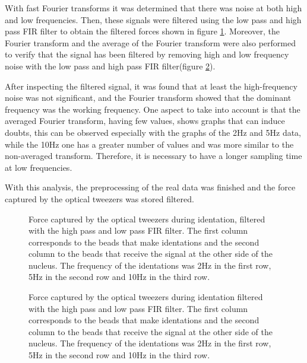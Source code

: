 \documentclass[12pt, a4paper]{article} %
\begin{document}
	\newpage
	
	With fast Fourier transforms it was determined that there was noise at both high and low frequencies. Then, these signals were filtered using the low pass and high pass FIR filter to obtain the filtered forces shown in figure \ref{fig:filtered_data}. Moreover, the Fourier transform and the average of the Fourier transform were also performed to verify that the signal has been filtered by removing high and low frequency noise with the low pass and high pass FIR filter(figure \ref{fig:fourier_con_filtro_todo}).
	
	After inspecting the filtered signal, it was found that at least the high-frequency noise was not significant, and the Fourier transform showed that the dominant frequency was the working frequency. One aspect to take into account is that the averaged Fourier transform, having few values, shows graphs that can induce doubts, this can be observed especially with the graphs of the 2Hz and 5Hz data, while the 10Hz one has a greater number of values and was more similar to the non-averaged transform. Therefore, it is necessary to have a longer sampling time at low frequencies.
	
	With this analysis, the preprocessing of the real data was finished and the force captured by the optical tweezers was stored filtered.
	
	\begin{figure}[htbp]
		\centering
		
		\caption{Force captured by the optical tweezers during identation, filtered with the high pass and low pass FIR filter. The first column corresponds to the beads that make identations and the second column to the beads that receive the signal at the other side of the nucleus. The frequency of the identations was 2Hz in the first row, 5Hz in the second row and 10Hz in the third row.}
		\label{fig:filtered_data}
	\end{figure}
	\begin{figure}[H]
		\centering
		
		\caption{Force captured by the optical tweezers during identation filtered with the high pass and low pass FIR filter. The first column corresponds to the beads that make identations and the second column to the beads that receive the signal at the other side of the nucleus. The frequency of the identations was 2Hz in the first row, 5Hz in the second row and 10Hz in the third row.}
		\label{fig:fourier_con_filtro_todo}
	\end{figure}
	
\end{document}
